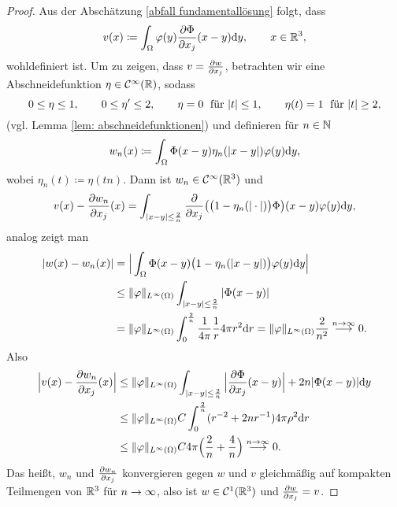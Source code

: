 \begin{proof}
	Aus der Abschätzung \eqref{abfall fundamentallösung} folgt, dass 
	\begin{equation*}
		v(x)\coloneqq\int_\Omega\varphi(y)\frac{\partial\Phi}{\partial x_j}(x-y)\mathrm{d}y,\qquad x\in\mathbb{R}^3,
	\end{equation*}
	wohldefiniert ist. Um zu zeigen, dass \(v=\frac{\partial w}{\partial x_j}\), betrachten wir eine Abschneidefunktion \(\eta\in\mathcal{C}^\infty(\mathbb{R})\), sodass
	\begin{equation*}
		0\leq\eta\leq1,\qquad0\leq\eta'\leq2,\qquad\eta=0\;\text{ für }|t|\leq1,\qquad\eta(t)=1\;\text{ für }|t|\geq2,
	\end{equation*}
	(vgl. Lemma \ref{lem: abschneidefunktionen}) und definieren für \(n\in\mathbb{N}\)
	\begin{equation*}
		w_n(x)\coloneqq\int_\Omega\Phi(x-y)\eta_n(|x-y|)\varphi(y)\mathrm{d}y,
	\end{equation*}
	wobei \(\eta_n(t)\coloneqq\eta(tn)\). Dann ist \(w_n\in\mathcal{C}^\infty(\mathbb{R}^3)\) und
	\begin{equation*}
		v(x)-\frac{\partial w_n}{\partial x_j}(x)=\int_{|x-y|\leq\frac{2}{n}}\frac{\partial}{\partial x_j}\big(\big(1-\eta_n(|\cdot|)\big)\Phi\big)(x-y)\varphi(y)\mathrm{d}y,
	\end{equation*}
	analog zeigt man
	\begin{align*}
		|w(x)-w_n(x)|&=\Big|\int_\Omega\Phi(x-y)\big(1-\eta_n(|x-y|)\big)\varphi(y)\mathrm{d}y\Big|\\
		&\leq\|\varphi\|_{L^\infty(\Omega)}\int_{|x-y|\leq\frac{2}{n}}|\Phi(x-y)|\\
		&=\|\varphi\|_{L^\infty(\Omega)}\int_0^\frac{2}{n}\frac{1}{4\pi}\frac{1}{r}4\pi r^2\mathrm{d}r=\|\varphi\|_{L^\infty(\Omega)}\frac{2}{n^2}\overset{n\to\infty}{\longrightarrow}0.
	\end{align*}
	Also
	\begin{align*}
		\Big|v(x)-\frac{\partial w_n}{\partial x_j}(x)\Big|
		&\leq\|\varphi\|_{L^\infty(\Omega)}\int_{|x-y|\leq\frac{2}{n}}\Big|\frac{\partial\Phi}{\partial x_j}(x-y)\Big|+2n|\Phi(x-y)|\mathrm{d}y\\
		&\leq\|\varphi\|_{L^\infty(\Omega)} C\int_0^{\frac{2}{n}}(r^{-2}+2nr^{-1})4\pi\rho^2\mathrm{d}r\\
		&\leq\|\varphi\|_{L^\infty(\Omega)} C4\pi\Big(\frac{2}{n}+\frac{4}{n}\Big)\overset{n\rightarrow\infty}{\longrightarrow}0.
	\end{align*}
	Das heißt, \(w_n\) und \(\frac{\partial w_n}{\partial x_j}\) konvergieren gegen \(w\) und \(v\) gleichmäßig auf kompakten Teilmengen von \(\mathbb{R}^3\) für \(n\rightarrow\infty\), also ist \(w\in\mathcal{C}^1(\mathbb{R}^3)\) und \(\frac{\partial w}{\partial x_j}=v\).
\end{proof}
